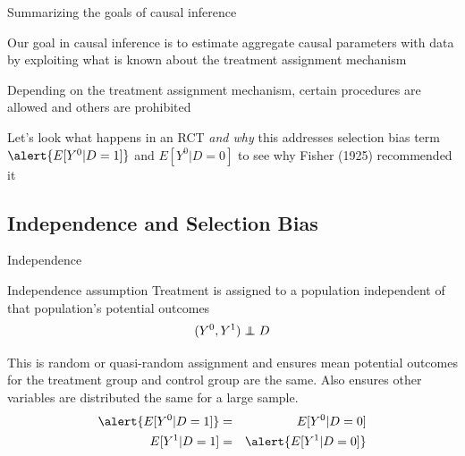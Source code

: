 \documentclass{beamer}
\newcommand\independent{\protect\mathpalette{\protect\independenT}{\perp}}
\def\independenT#1#2{\mathrel{\rlap{$#1#2$}\mkern2mu{#1#2}}}
\begin{document}
\begin{frame}{Summarizing the goals of causal inference}

  Our goal in causal inference is to estimate aggregate causal parameters with data by exploiting what is known about the treatment assignment mechanism

  \bigskip

Depending on the treatment assignment mechanism, certain procedures are allowed and others are prohibited

  \bigskip

  Let's look what happens in an RCT \emph{and why} this addresses selection bias term $\alert{E[Y^0|D=1]}$ and $E[Y^0|D=0]$ to see why Fisher (1925) recommended it

\end{frame}



\subsection{Independence and Selection Bias}

\begin{frame}{Independence}


  \begin{block}{Independence assumption}
    Treatment is assigned to a population independent of that population's potential outcomes  $$(Y^0,Y^1)\independent{D}$$
  \end{block}
  This is random or quasi-random assignment and ensures mean potential outcomes for the treatment group and control group are the same.  Also ensures other variables are distributed the same for a large sample.
  \begin{eqnarray*}
    \alert{E[Y^0|D=1]} &=& E[Y^0 | D=0] \\
    E[Y^1|D=1] &=& \alert{E[Y^1 | D=0]}
  \end{eqnarray*}
\end{frame}
\end{document}
